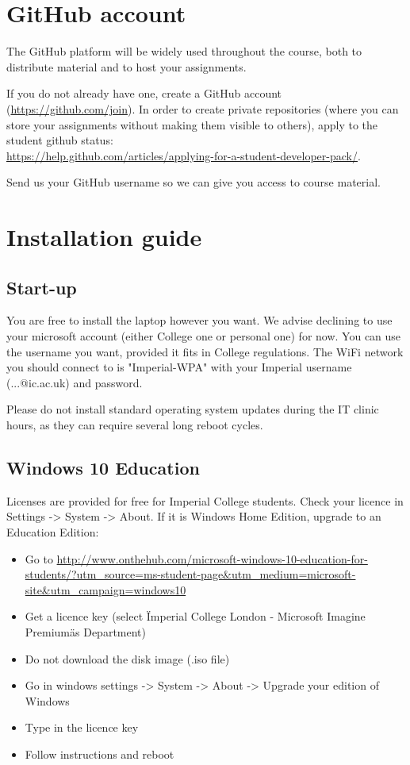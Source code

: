 \documentclass[11pt]{article}
\begin{document}
\section{GitHub account}

The GitHub platform will be widely used throughout the course, both to distribute material and to host your assignments.

If you do not already have one, create a GitHub account (\url{https://github.com/join}).
In order to create private repositories (where you can store your assignments without making them visible to others), apply to the student github status:\\ 
\url{https://help.github.com/articles/applying-for-a-student-developer-pack/}.

Send us your GitHub username so we can give you access to course material.


\section{Installation guide}

\subsection{Start-up}

You are free to install the laptop however you want. We advise declining to use your microsoft account (either College one or personal one) for now. You can use the username you want, provided it fits in College regulations. The WiFi network you should connect to is "Imperial-WPA" with your Imperial username (...@ic.ac.uk) and password.

Please do not install standard operating system updates during the IT clinic hours, as they can require several long reboot cycles.

\subsection{Windows 10 Education}

Licenses are provided for free for Imperial College students. Check your licence in Settings -> System -> About. If it is Windows Home Edition, upgrade to an Education Edition:
\begin{itemize}
  \item Go to \url{http://www.onthehub.com/microsoft-windows-10-education-for-students/?utm_source=ms-student-page&utm_medium=microsoft-site&utm_campaign=windows10}
  \item Get a licence key (select \"Imperial College London - Microsoft Imagine Premium\" as Department)
  \item Do not download the disk image (.iso file)
  \item Go in windows settings -> System -> About -> Upgrade your edition of Windows
  \item Type in the licence key
  \item Follow instructions and reboot
\end{itemize}
\end{document}
